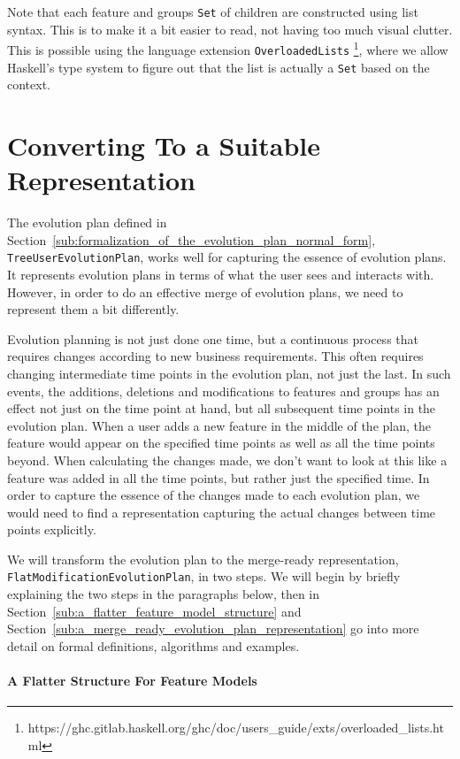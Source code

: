 \documentclass[a4paper,english]{ifimaster}
\begin{document}
Note that each feature and groups \texttt{Set} of children are constructed using list syntax. This is to make it a bit easier to read, not having too much visual clutter. This is possible using the language extension \texttt{OverloadedLists} \footnote{https://ghc.gitlab.haskell.org/ghc/doc/users\_guide/exts/overloaded\_lists.html}, where we allow Haskell's type system to figure out that the list is actually a \texttt{Set} based on the context.

\section{Converting To a Suitable Representation}%
\label{sec:converting_to_a_suitable_representation}

The evolution plan defined in Section~\vref{sub:formalization_of_the_evolution_plan_normal_form}, \texttt{TreeUserEvolutionPlan}, works well for capturing the essence of evolution plans. It represents evolution plans in terms of what the user sees and interacts with. However, in order to do an effective merge of evolution plans, we need to represent them a bit differently.

Evolution planning is not just done one time, but a continuous process that requires changes according to new business requirements. This often requires changing intermediate time points in the evolution plan, not just the last. In such events, the additions, deletions and modifications to features and groups has an effect not just on the time point at hand, but all subsequent time points in the evolution plan. When a user adds a new feature in the middle of the plan, the feature would appear on the specified time points as well as all the time points beyond. When calculating the changes made, we don't want to look at this like a feature was added in all the time points, but rather just the specified time. In order to capture the essence of the changes made to each evolution plan, we would need to find a representation capturing the actual changes between time points explicitly.

We will transform the evolution plan to the merge-ready representation, \texttt{FlatModificationEvolutionPlan}, in two steps. We will begin by briefly explaining the two steps in the paragraphs below, then in Section~\vref{sub:a_flatter_feature_model_structure} and Section~\vref{sub:a_merge_ready_evolution_plan_representation} go into more detail on formal definitions, algorithms and examples.

\paragraph{A Flatter Structure For Feature Models}%
\label{par:a_flatter_structure_for_feature_models}
\end{document}

